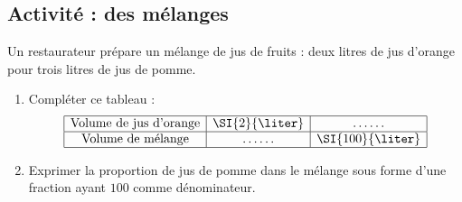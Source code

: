 
\subsection*{Activité : des mélanges}

Un restaurateur prépare un mélange de jus de fruits : deux litres de jus d'orange pour trois litres de jus de pomme. 
\begin{enumerate}
    \item
        Compléter ce tableau :
        \begin{equation*}
            \begin{array}[]{|c|c|c|}
                \hline
                \text{Volume de jus d'orange}&\SI{2}{\liter}&\ldots\ldots\\
                \hline
                \text{Volume de mélange}&\ldots\ldots&\SI{100}{\liter}\\
                \hline
            \end{array}
        \end{equation*}
    \item
        Exprimer la proportion de jus de pomme dans le mélange sous forme d'une fraction ayant \( 100\) comme dénominateur.
\end{enumerate}
